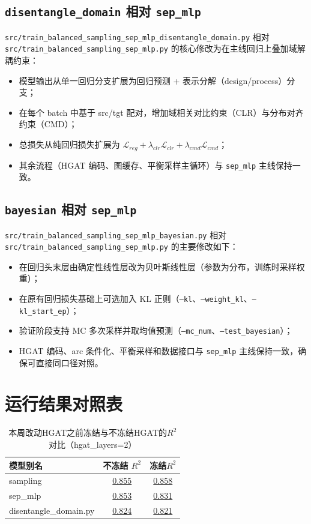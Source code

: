 \documentclass[12pt,a4paper]{ctexart}
\begin{document}
\subsection{\texttt{disentangle\_domain} 相对 \texttt{sep\_mlp}}
\texttt{src/train\_balanced\_sampling\_sep\_mlp\_disentangle\_domain.py} 相对
\texttt{src/train\_balanced\_sampling\_sep\_mlp.py} 的核心修改为在主线回归上叠加域解耦约束：
\begin{itemize}
  \item 模型输出从单一回归分支扩展为回归预测 + 表示分解（design/process）分支；
  \item 在每个 batch 中基于 src/tgt 配对，增加域相关对比约束（CLR）与分布对齐约束（CMD）；
  \item 总损失从纯回归损失扩展为
  \(\mathcal{L}_{reg} + \lambda_{clr}\mathcal{L}_{clr} + \lambda_{cmd}\mathcal{L}_{cmd}\)；
  \item 其余流程（HGAT 编码、图缓存、平衡采样主循环）与 \texttt{sep\_mlp} 主线保持一致。
\end{itemize}

\subsection{\texttt{bayesian} 相对 \texttt{sep\_mlp}}
\texttt{src/train\_balanced\_sampling\_sep\_mlp\_bayesian.py} 相对
\texttt{src/train\_balanced\_sampling\_sep\_mlp.py} 的主要修改如下：
\begin{itemize}
	\item 在回归头末层由确定性线性层改为贝叶斯线性层（参数为分布，训练时采样权重）；
	\item 在原有回归损失基础上可选加入 KL 正则（\texttt{--kl}、\texttt{--weight\_kl}、\texttt{--kl\_start\_ep}）；
	\item 验证阶段支持 MC 多次采样并取均值预测（\texttt{--mc\_num}、\texttt{--test\_bayesian}）；
	\item HGAT 编码、arc 条件化、平衡采样和数据接口与 \texttt{sep\_mlp} 主线保持一致，确保可直接同口径对照。
\end{itemize}

\section{运行结果对照表}
\renewcommand{\arraystretch}{1.2}
\begin{table}[!htbp]
	\centering
	\small
	\setlength{\tabcolsep}{10pt}
	\begin{tabular}{>{\raggedright\arraybackslash}p{}cc}
		\toprule
		模型别名 & 不冻结 $R^2$ & 冻结$R^2$ \\
		\midrule
		sampling & \underline{0.855} & \underline{0.858} \\
		sep\_mlp & \underline{0.853} & \underline{0.831} \\
		disentangle\_domain.py & \underline{0.824} & \underline{0.821} \\
		
		\bottomrule
	\end{tabular}
	\caption{本周改动HGAT之前冻结与不冻结HGAT的$R^2$对比（hgat\_layers=2）}
\end{table}
\end{document}
